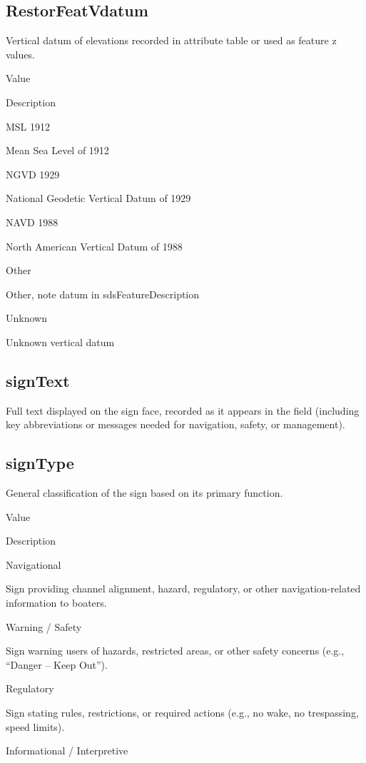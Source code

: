\documentclass[
  letterpaper,
  DIV=11,
  numbers=noendperiod]{scrreprt}
\begin{document}
\subsection{RestorFeatVdatum}\label{restorfeatvdatum-24}

Vertical datum of elevations recorded in attribute table or used as
feature z values.

Value

Description

MSL 1912

Mean Sea Level of 1912

NGVD 1929

National Geodetic Vertical Datum of 1929

NAVD 1988

North American Vertical Datum of 1988

Other

Other, note datum in sdsFeatureDescription

Unknown

Unknown vertical datum

\subsection{signText}\label{signtext}

Full text displayed on the sign face, recorded as it appears in the
field (including key abbreviations or messages needed for navigation,
safety, or management).

\subsection{signType}\label{signtype}

General classification of the sign based on its primary function.

Value

Description

Navigational

Sign providing channel alignment, hazard, regulatory, or other
navigation-related information to boaters.

Warning / Safety

Sign warning users of hazards, restricted areas, or other safety
concerns (e.g., ``Danger -- Keep Out'').

Regulatory

Sign stating rules, restrictions, or required actions (e.g., no wake, no
trespassing, speed limits).

Informational / Interpretive
\end{document}
